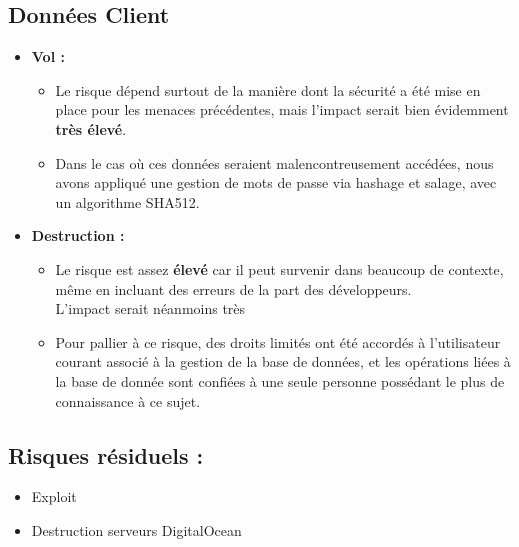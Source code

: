 \documentclass{report}
\begin{document}
		\subsection{Données Client}

			\begin{itemize}
				\item \textbf{Vol :}\\
					\begin{itemize}
						\item Le risque dépend surtout de la manière dont la sécurité a été mise en place pour les menaces précédentes, mais l'impact serait bien évidemment \textbf{très élevé}.
						\item Dans le cas où ces données seraient malencontreusement accédées, nous avons appliqué une gestion de mots de passe via hashage et salage, avec un algorithme SHA512.\\
					\end{itemize}
			\end{itemize}

			\begin{itemize}
				\item \textbf{Destruction :}\\
					\begin{itemize}
						\item Le risque est assez \textbf{élevé} car il peut survenir dans beaucoup de contexte, même en incluant des erreurs de la part des développeurs.\\
						L'impact serait néanmoins très \textbf{}
						\item Pour pallier à ce risque, des droits limités ont été accordés à l'utilisateur courant associé à la gestion de la base de données, et les opérations liées à la base de donnée sont confiées à une seule personne possédant le plus de connaissance à ce sujet.\\
					\end{itemize}
			\end{itemize}

		\subsection{Risques résiduels :}

			\begin{itemize}
				\item Exploit
				\item Destruction serveurs DigitalOcean
			\end{itemize}
\end{document}
